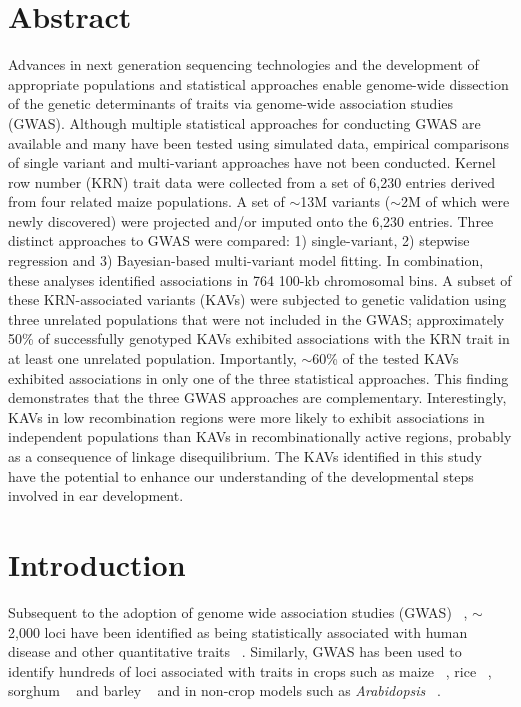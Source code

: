 \documentclass[10pt,letterpaper]{article}
\begin{document}
\section*{Abstract}
Advances in next generation sequencing technologies and the development of appropriate populations and statistical approaches enable genome-wide dissection of the genetic determinants of traits via genome-wide association studies (GWAS). Although multiple statistical approaches for conducting GWAS are available and many have been tested using simulated data, empirical comparisons of single variant and multi-variant approaches have not been conducted. Kernel row number (KRN) trait data were collected from a set of 6,230 entries derived from four related maize populations. A set of $\sim$13M variants ($\sim$2M of which were newly discovered) were projected and/or imputed onto the 6,230 entries. Three distinct approaches to GWAS were compared: 1) single-variant, 2) stepwise regression and 3) Bayesian-based multi-variant model fitting. In combination, these analyses identified associations in 764 100-kb chromosomal bins. A subset of these KRN-associated variants (KAVs) were subjected to genetic validation using three unrelated populations that were not included in the GWAS; approximately 50\% of successfully genotyped KAVs exhibited associations with the KRN trait in at least one unrelated population. Importantly, $\sim$60\% of the tested KAVs exhibited associations in only one of the three statistical approaches. This finding demonstrates that the three GWAS approaches are complementary. Interestingly, KAVs in low recombination regions were more likely to exhibit associations in independent populations than KAVs in recombinationally active regions, probably as a consequence of linkage disequilibrium. The KAVs identified in this study have the potential to enhance our understanding of the developmental steps involved in ear development.


\linenumbers


\section*{Introduction}

Subsequent to the adoption of genome wide association studies (GWAS) ~\cite{Klein2005}, $\sim$2,000 loci have been identified as being statistically associated with human disease and other quantitative traits ~\cite{Visscher2012}. Similarly, GWAS has been used to identify hundreds of loci associated with traits in crops such as maize ~\cite{Brown2011, Tian2011}, rice ~\cite{Huang2010}, sorghum ~\cite{Morris2013} and barley ~\cite{Cockram2010} and in non-crop models such as \emph{Arabidopsis} ~\cite{Atwell2010, Meijon2014}. 
\end{document}
